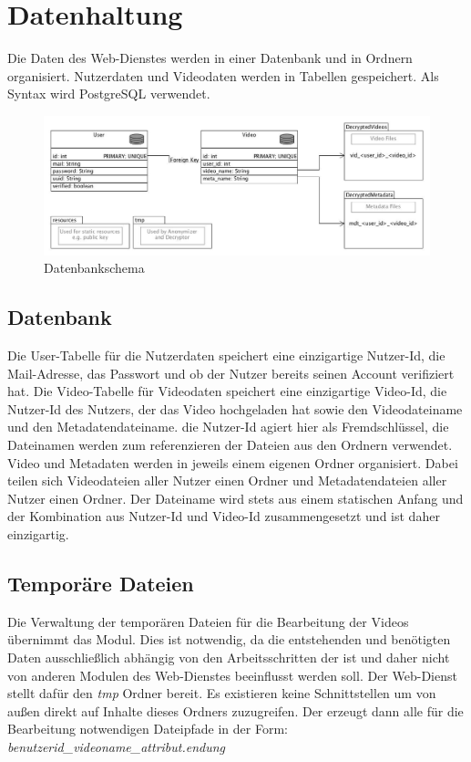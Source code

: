 \section{Datenhaltung}
Die Daten des Web-Dienstes werden in einer Datenbank und in Ordnern organisiert. 
Nutzerdaten und Videodaten werden in Tabellen gespeichert. Als Syntax wird PostgreSQL verwendet. 

\begin{figure}[ht]
	\centering
\includegraphics[width=1\textwidth]{./resources/Diagramme/Webservice/database_scheme.jpg}
\caption{Datenbankschema}
	\label{fig:overview_mvp}
\end{figure}

\subsection{Datenbank}

Die User-Tabelle für die Nutzerdaten speichert eine einzigartige Nutzer-Id, die Mail-Adresse, das Passwort und ob der Nutzer bereits seinen Account verifiziert hat.\newline
Die Video-Tabelle für Videodaten speichert eine einzigartige  Video-Id, die Nutzer-Id des Nutzers, der das Video hochgeladen hat sowie den Videodateiname und den Metadatendateiname. die Nutzer-Id agiert hier als Fremdschlüssel, die Dateinamen werden zum referenzieren der Dateien aus den Ordnern verwendet.\newline
Video und Metadaten werden in jeweils einem eigenen Ordner organisiert. Dabei teilen sich Videodateien aller Nutzer einen Ordner und Metadatendateien aller Nutzer einen Ordner. Der Dateiname wird stets aus einem statischen Anfang und der Kombination aus Nutzer-Id und Video-Id zusammengesetzt und ist daher einzigartig.

\subsection{Temporäre Dateien}
Die Verwaltung der temporären Dateien für die Bearbeitung der Videos übernimmt das  Modul. Dies ist notwendig, da die entstehenden und benötigten Daten ausschließlich abhängig von den Arbeitsschritten der  ist und daher nicht von anderen Modulen des Web-Dienstes beeinflusst werden soll. Der Web-Dienst stellt dafür den \textit{tmp} Ordner bereit. Es existieren keine Schnittstellen um von außen direkt auf Inhalte dieses Ordners zuzugreifen.\newline
Der  erzeugt dann alle für die Bearbeitung notwendigen Dateipfade in der Form:\newline
\textit{benutzerid\_videoname\_attribut.endung}

